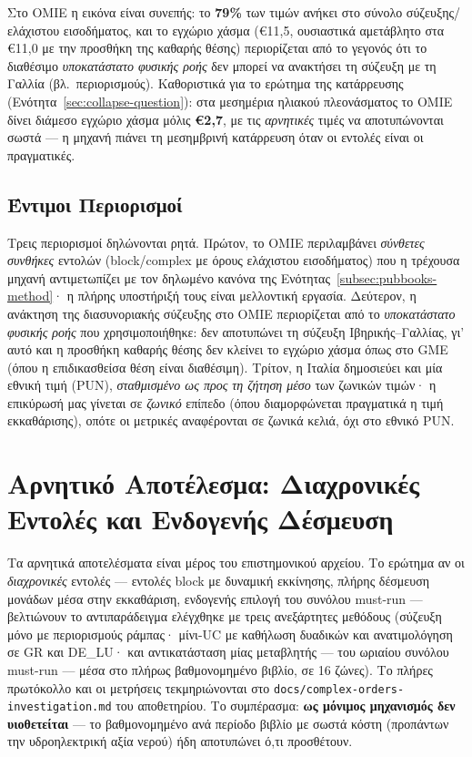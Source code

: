 Στο OMIE η εικόνα είναι συνεπής: το \textbf{79\%} των τιμών ανήκει στο σύνολο σύζευξης/ελάχιστου εισοδήματος, και το εγχώριο χάσμα (€11,5, ουσιαστικά αμετάβλητο στα €11,0 με την προσθήκη της καθαρής θέσης) περιορίζεται από το γεγονός ότι το διαθέσιμο \emph{υποκατάστατο φυσικής ροής} δεν μπορεί να ανακτήσει τη σύζευξη με τη Γαλλία (βλ.\ περιορισμούς). Καθοριστικά για το ερώτημα της κατάρρευσης (Ενότητα~\ref{sec:collapse-question}): στα μεσημέρια ηλιακού πλεονάσματος το OMIE δίνει διάμεσο εγχώριο χάσμα μόλις \textbf{€2,7}, με τις \emph{αρνητικές} τιμές να αποτυπώνονται σωστά --- η μηχανή πιάνει τη μεσημβρινή κατάρρευση όταν οι εντολές είναι οι πραγματικές.

\subsection{Έντιμοι Περιορισμοί}
\label{subsec:pubbooks-caveats}

Τρεις περιορισμοί δηλώνονται ρητά. Πρώτον, το OMIE περιλαμβάνει \emph{σύνθετες συνθήκες} εντολών (block/complex με όρους ελάχιστου εισοδήματος) που η τρέχουσα μηχανή αντιμετωπίζει με τον δηλωμένο κανόνα της Ενότητας~\ref{subsec:pubbooks-method}· η πλήρης υποστήριξή τους είναι μελλοντική εργασία. Δεύτερον, η ανάκτηση της διασυνοριακής σύζευξης στο OΜΙΕ περιορίζεται από το \emph{υποκατάστατο φυσικής ροής} που χρησιμοποιήθηκε: δεν αποτυπώνει τη σύζευξη Ιβηρικής--Γαλλίας, γι' αυτό και η προσθήκη καθαρής θέσης δεν κλείνει το εγχώριο χάσμα όπως στο GME (όπου η επιδικασθείσα θέση είναι διαθέσιμη). Τρίτον, η Ιταλία δημοσιεύει και μία εθνική τιμή (PUN), \emph{σταθμισμένο ως προς τη ζήτηση μέσο} των ζωνικών τιμών· η επικύρωσή μας γίνεται σε \emph{ζωνικό} επίπεδο (όπου διαμορφώνεται πραγματικά η τιμή εκκαθάρισης), οπότε οι μετρικές αναφέρονται σε ζωνικά κελιά, όχι στο εθνικό PUN.


\section{Αρνητικό Αποτέλεσμα: Διαχρονικές Εντολές και Ενδογενής Δέσμευση}
\label{sec:negative-complex-orders}

Τα αρνητικά αποτελέσματα είναι μέρος του επιστημονικού αρχείου. Το ερώτημα αν οι \emph{διαχρονικές} εντολές --- εντολές block με δυναμική εκκίνησης, πλήρης δέσμευση μονάδων μέσα στην εκκαθάριση, ενδογενής επιλογή του συνόλου must-run --- βελτιώνουν το αντιπαράδειγμα ελέγχθηκε με τρεις ανεξάρτητες μεθόδους (σύζευξη μόνο με περιορισμούς ράμπας· μίνι-UC με καθήλωση δυαδικών και ανατιμολόγηση σε GR και DE\_LU· και αντικατάσταση μίας μεταβλητής --- του ωριαίου συνόλου must-run --- μέσα στο πλήρως βαθμονομημένο βιβλίο, σε 16 ζώνες). Το πλήρες πρωτόκολλο και οι μετρήσεις τεκμηριώνονται στο \texttt{docs/complex-orders-investigation.md} του αποθετηρίου. Το συμπέρασμα: \textbf{ως μόνιμος μηχανισμός δεν υιοθετείται} --- το βαθμονομημένο ανά περίοδο βιβλίο με σωστά κόστη (προπάντων την υδροηλεκτρική αξία νερού) ήδη αποτυπώνει ό,τι προσθέτουν.

